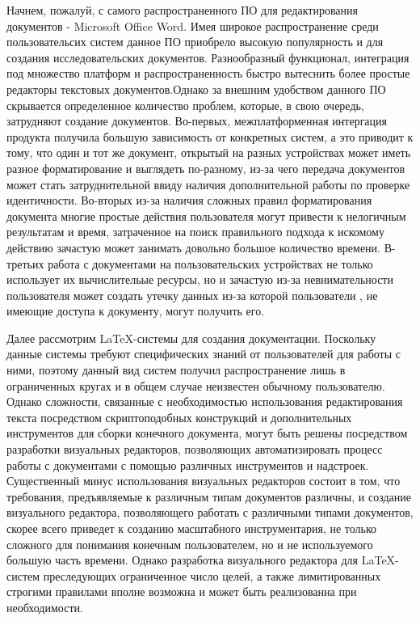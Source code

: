 Начнем, пожалуй, с самого распространенного ПО для редактирования документов - Microsoft Office Word. Имея широкое распространение среди пользовательсих систем данное ПО приобрело высокую популярность и для создания исследовательских документов. Разнообразный функционал, интеграция под множество платформ и распространенность быстро вытеснить более простые редакторы текстовых документов.Однако за внешним удобством данного ПО скрывается определенное количество проблем, которые, в свою очередь, затрудняют создание документов. Во-первых, межплатформенная интергация продукта получила большую зависимость от конкретных систем, а это приводит к тому, что один и тот же документ, открытый на разных устройствах может иметь разное форматирование и выглядеть по-разному, из-за чего передача  документов может стать затруднительной ввиду наличия дополнительной работы по проверке идентичности. Во-вторых из-за наличия сложных правил форматирования документа многие простые действия пользователя могут привести к нелогичным результатам и время, затраченное на поиск правильного подхода к искомому действию зачастую может занимать довольно большое количество времени. В-третьих работа с документами на пользовательских устройствах не только использует их вычислительые ресурсы, но и зачастую из-за невнимательности пользователя может создать утечку данных из-за которой пользователи , не имеющие доступа к документу, могут получить его.

Далее рассмотрим LaTeX-системы для создания документации. Поскольку данные системы требуют специфических знаний от пользователей для работы с ними, поэтому данный вид систем получил распространение лишь в ограниченных кругах и в общем случае неизвестен обычному пользователю. Однако сложности, связанные с необходимостью использования редактирования текста посредством скриптоподобных конструкций и дополнительных инструментов для сборки конечного документа, могут быть решены посредством разработки визуальных редакторов, позволяющих автоматизировать процесс работы с документами с помощью различных инструментов и надстроек. Существенный минус использования визуальных редакторов состоит в том, что требования, предъявляемые к различным типам документов различны, и создание визуального редактора, позволяющего работать с различными типами документов, скорее всего приведет к созданию масштабного инструментария, не только сложного для понимания конечным пользователем, но и не используемого большую часть времени. Однако разработка визуального редактора для LaTeX-систем преследующих ограниченное число целей, а также лимитированных строгими правилами вполне возможна и может быть реализованна при необходимости.

